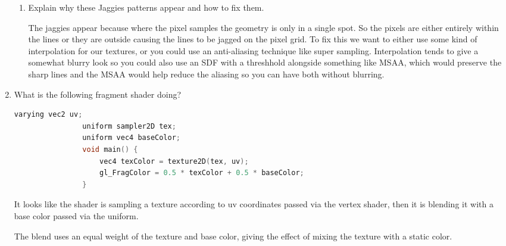 \documentclass{article}
\begin{document}
\begin{enumerate}
\begin{enumerate}
                \item Explain why these Jaggies patterns appear and how to fix them.
                    \begin{mdframed}
                        The jaggies appear because where the pixel samples the geometry is only in a single
                        spot. So the pixels are either entirely within the lines or they are outside causing the
                        lines to be jagged on the pixel grid. To fix this we want to either use
                        some kind of interpolation for our textures, or you could use an anti-aliasing technique
                        like super sampling. Interpolation tends to give a somewhat blurry look so you could also
                        use an SDF with a threshhold alongside something like MSAA, which would preserve
                        the sharp lines and the MSAA would help reduce the aliasing so you can have both without
                        blurring.
                    \end{mdframed}
            \end{enumerate}

        \item What is the following fragment shader doing?
            \begin{lstlisting}[language=C,gobble = 16]
                varying vec2 uv;
                uniform sampler2D tex;
                uniform vec4 baseColor;
                void main() {
                    vec4 texColor = texture2D(tex, uv);
                    gl_FragColor = 0.5 * texColor + 0.5 * baseColor;
                } 
            \end{lstlisting}

            \begin{mdframed}
                It looks like the shader is sampling a texture
                according to uv coordinates passed via the vertex shader,
                then it is blending it with a base color passed via the uniform.

                The blend uses an equal weight of the texture and base color, giving
                the effect of mixing the texture with a static color.
            \end{mdframed}
    \end{enumerate}
\end{document}
